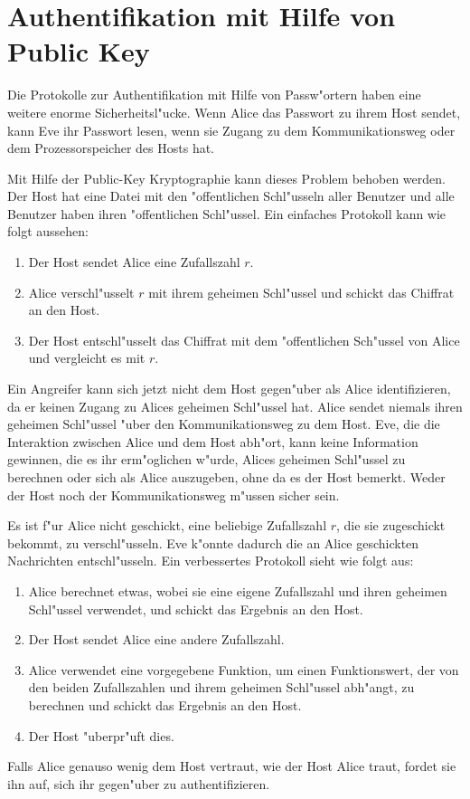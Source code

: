 
\section{Authentifikation mit Hilfe von Public Key}

Die Protokolle zur Authentifikation mit Hilfe von Passw"ortern haben
eine weitere enorme Sicherheitsl"ucke. Wenn Alice das Passwort zu
ihrem Host sendet, kann Eve ihr Passwort lesen, wenn sie Zugang zu dem
Kommunikationsweg oder dem Prozessorspeicher des Hosts hat.

Mit Hilfe der Public-Key Kryptographie kann dieses Problem behoben
werden. Der Host hat eine Datei mit den "offentlichen Schl"usseln
aller Benutzer und alle Benutzer haben ihren "offentlichen
Schl"ussel. Ein einfaches Protokoll kann wie folgt aussehen:
\begin{enumerate}
  \item Der Host sendet Alice eine Zufallszahl $r$.
  \item Alice verschl"usselt $r$ mit ihrem geheimen Schl"ussel und
        schickt das Chiffrat an den Host.
  \item Der Host entschl"usselt das Chiffrat mit dem "offentlichen
        Sch"ussel von Alice und vergleicht es mit $r$.
\end{enumerate}
Ein Angreifer kann sich jetzt nicht dem Host gegen"uber als Alice
identifizieren, da er keinen Zugang zu Alices geheimen Schl"ussel
hat. Alice sendet niemals ihren geheimen Schl"ussel "uber den
Kommunikationsweg zu dem Host. Eve, die die Interaktion zwischen Alice
und dem Host abh"ort, kann keine Information gewinnen, die es ihr
erm"oglichen w"urde, Alices geheimen Schl"ussel zu berechnen oder sich
als Alice auszugeben, ohne da\3 es der Host bemerkt. Weder der Host
noch der Kommunikationsweg m"ussen sicher sein.

Es ist f"ur Alice nicht geschickt, eine beliebige Zufallszahl $r$, die
sie zugeschickt bekommt, zu verschl"usseln. Eve k"onnte dadurch
die an Alice geschickten Nachrichten entschl"usseln. Ein verbessertes 
Protokoll sieht wie folgt aus:
\begin{enumerate}
  \item Alice berechnet etwas, wobei sie eine eigene Zufallszahl und
        ihren geheimen Schl"ussel verwendet, und schickt das Ergebnis
        an den Host.
  \item Der Host sendet Alice eine andere Zufallszahl.
  \item Alice verwendet eine vorgegebene Funktion, um einen
        Funktionswert, der von den beiden Zufallszahlen und ihrem
        geheimen Schl"ussel abh"angt, zu berechnen und schickt das
        Ergebnis an den Host.
  \item Der Host "uberpr"uft dies.
\end{enumerate}
Falls Alice genauso wenig dem Host vertraut, wie der Host Alice traut,
fordet sie ihn auf, sich ihr gegen"uber zu authentifizieren.

